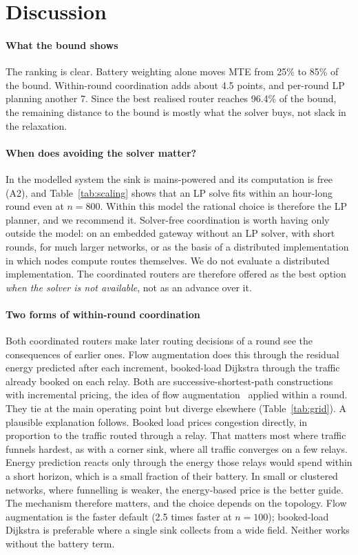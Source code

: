 \section{Discussion}\label{sec:discussion}

\paragraph{What the bound shows} The ranking is clear. Battery weighting alone moves MTE from 25\% to 85\% of the bound. Within-round coordination adds about 4.5 points, and per-round LP planning another 7. Since the best realised router reaches 96.4\% of the bound, the remaining distance to the bound is mostly what the solver buys, not slack in the relaxation.

\paragraph{When does avoiding the solver matter?} In the modelled system the sink is mains-powered and its computation is free (A2), and Table~\ref{tab:scaling} shows that an LP solve fits within an hour-long round even at $n=800$. Within this model the rational choice is therefore the LP planner, and we recommend it. Solver-free coordination is worth having only outside the model: on an embedded gateway without an LP solver, with short rounds, for much larger networks, or as the basis of a distributed implementation in which nodes compute routes themselves. We do not evaluate a distributed implementation. The coordinated routers are therefore offered as the best option \emph{when the solver is not available}, not as an advance over it.

\paragraph{Two forms of within-round coordination} Both coordinated routers make later routing decisions of a round see the consequences of earlier ones. Flow augmentation does this through the residual energy predicted after each increment, booked-load Dijkstra through the traffic already booked on each relay. Both are successive-shortest-path constructions with incremental pricing, the idea of flow augmentation~\cite{chang2004maximum} applied within a round. They tie at the main operating point but diverge elsewhere (Table~\ref{tab:grid}). A plausible explanation follows. Booked load prices congestion directly, in proportion to the traffic routed through a relay. That matters most where traffic funnels hardest, as with a corner sink, where all traffic converges on a few relays. Energy prediction reacts only through the energy those relays would spend within a short horizon, which is a small fraction of their battery. In small or clustered networks, where funnelling is weaker, the energy-based price is the better guide. The mechanism therefore matters, and the choice depends on the topology. Flow augmentation is the faster default (2.5 times faster at $n=100$); booked-load Dijkstra is preferable where a single sink collects from a wide field. Neither works without the battery term.

